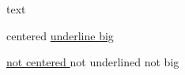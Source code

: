 


\label{0}


text 
\begin{center}
 centered \uline{ underline {\large  big }}
\end{center}
\uline{{\large  not centered }}{\large  not underlined } not big




